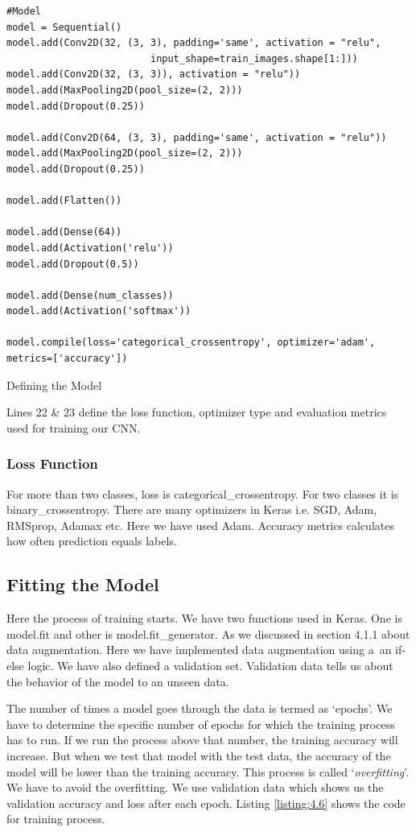 \begin{longlisting}
    \begin{verbatim}
#Model
model = Sequential()
model.add(Conv2D(32, (3, 3), padding='same', activation = "relu",
                         input_shape=train_images.shape[1:]))
model.add(Conv2D(32, (3, 3)), activation = "relu"))
model.add(MaxPooling2D(pool_size=(2, 2)))
model.add(Dropout(0.25))   

model.add(Conv2D(64, (3, 3), padding='same', activation = "relu"))
model.add(MaxPooling2D(pool_size=(2, 2)))
model.add(Dropout(0.25)) 
     
model.add(Flatten())

model.add(Dense(64))
model.add(Activation('relu'))
model.add(Dropout(0.5)) 

model.add(Dense(num_classes))
model.add(Activation('softmax'))

model.compile(loss='categorical_crossentropy', optimizer='adam',
metrics=['accuracy'])
    \end{verbatim}
    \caption{Defining the Model}
\label{listing:4.5}
\end{longlisting}
\noindent Lines 22 \& 23 define the loss function,
optimizer type and evaluation metrics used for training our CNN.
\subsubsection{Loss Function}

For more than two classes, loss is categorical\_crossentropy. For two
classes it is binary\_crossentropy. There are many optimizers in Keras i.e.
SGD, Adam, RMSprop, Adamax etc. Here we have used Adam. Accuracy metrics calculates how
often prediction equals labels.
\subsection{Fitting the Model}
Here the process of training starts. We have two functions used in Keras. One
is model.fit and other is model.fit\_generator. As we discussed in section 4.1.1
about data augmentation. Here we have implemented data augmentation using a\
an if-else logic. We have also defined a validation set. Validation data tells us about the
behavior of the model to an unseen data.

The number of times a model goes through the data is termed as `epochs'.
We have to determine the specific number of epochs for which the training process has to
run. If we run the process above that number, the training accuracy will
increase. But when we test that model with the test data, the accuracy of the model
will be lower than the training accuracy. This process is called `\textit{overfitting}'.
We have to avoid the overfitting. We use validation data which shows us the validation accuracy
and loss after each epoch. Listing \ref{listing:4.6} shows the code for training process.

